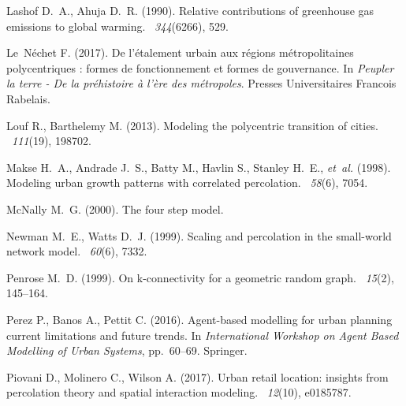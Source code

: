 \documentclass{article}
\begin{document}
\begin{thebibliography}{}
Lashof D.~A., Ahuja D.~R. (1990).
\newblock Relative contributions of greenhouse gas emissions to global warming.
~{\em 344\/}(6266), 529.


Le~N{\'e}chet F. (2017).
\newblock De l'{\'e}talement urbain aux r{\'e}gions m{\'e}tropolitaines
  polycentriques : formes de fonctionnement et formes de gouvernance.
\newblock In {\em {Peupler la terre - De la pr{\'e}histoire {\`a} l'{\`e}re des
  m{\'e}tropoles}}. Presses Universitaires Francois Rabelais.


Louf R., Barthelemy M. (2013).
\newblock Modeling the polycentric transition of cities.
~{\em 111\/}(19), 198702.


Makse H.~A., Andrade J.~S., Batty M., Havlin S., Stanley H.~E., \textit{et~al.}
  (1998).
\newblock Modeling urban growth patterns with correlated percolation.
~{\em 58\/}(6), 7054.


McNally M.~G. (2000).
\newblock The four step model.


Newman M.~E., Watts D.~J. (1999).
\newblock Scaling and percolation in the small-world network model.
~{\em 60\/}(6), 7332.


Penrose M.~D. (1999).
\newblock On k-connectivity for a geometric random graph.
~{\em 15\/}(2), 145--164.


Perez P., Banos A., Pettit C. (2016).
\newblock Agent-based modelling for urban planning current limitations and
  future trends.
\newblock In {\em International Workshop on Agent Based Modelling of Urban
  Systems}, pp.\  60--69. Springer.


Piovani D., Molinero C., Wilson A. (2017).
\newblock Urban retail location: insights from percolation theory and spatial
  interaction modeling.
~{\em 12\/}(10), e0185787.



\end{thebibliography}
\end{document}
